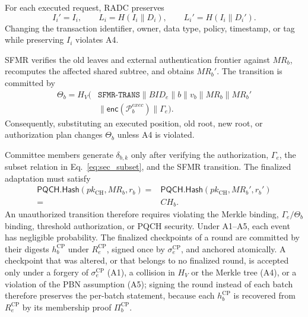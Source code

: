 \documentclass[lettersize,journal]{IEEEtran}
\begin{document}
For each executed request, RADC preserves
\begin{equation}
I_i'=I_i,
\qquad
L_i=H(I_i\parallel D_i),
\qquad
L_i'=H(I_i\parallel D_i').
\end{equation}
Changing the transaction identifier, owner, data type, policy,
timestamp, or tag while preserving $I_i$ violates A4.

SFMR verifies the old leaves and external authentication frontier
against $MR_b$, recomputes the affected shared subtree, and obtains
$MR_b'$. The transition is committed by
\begin{equation}
\begin{aligned}
\Theta_b=H_V(&\texttt{SFMR-TRANS}\parallel BID_e\parallel b
\parallel v_b\parallel MR_b\parallel MR_b'\\
&\parallel\mathsf{enc}(\mathcal{P}_b^{exec})
\parallel\Gamma_e).
\end{aligned}
\label{eq:sec_theta}
\end{equation}
Consequently, substituting an executed position, old root, new root,
or authorization plan changes $\Theta_b$ unless A4 is violated.

Committee members generate $\delta_{b,k}$ only after verifying the
authorization, $\Gamma_e$, the subset relation in
Eq.~\eqref{eq:sec_subset}, and the SFMR transition. The finalized
adaptation must satisfy
\begin{equation}
\begin{split}
\mathsf{PQCH.Hash}(pk_{\mathrm{CH}},MR_b,r_b)
={}&
\mathsf{PQCH.Hash}(pk_{\mathrm{CH}},MR_b',r_b')\\
={}&CH_b.
\end{split}
\label{eq:sec_pqch_continuity}
\end{equation}
An unauthorized transition therefore requires violating the Merkle
binding, $\Gamma_e/\Theta_b$ binding, threshold authorization, or
PQCH security. Under A1--A5, each event has negligible probability.
\textcolor{e5}{The finalized checkpoints of a round are committed by
their digests $h_b^{\mathrm{CP}}$ under $R_e^{\mathrm{CP}}$, signed once
by $\sigma_e^{\mathrm{CP}}$, and anchored atomically. A checkpoint that
was altered, or that belongs to no finalized round, is accepted only
under a forgery of $\sigma_e^{\mathrm{CP}}$ (A1), a collision in $H_V$ or
the Merkle tree (A4), or a violation of the PBN assumption (A5); signing
the round instead of each batch therefore preserves the per-batch
statement, because each $h_b^{\mathrm{CP}}$ is recovered from
$R_e^{\mathrm{CP}}$ by its membership proof $\Pi_b^{\mathrm{CP}}$.}
\end{document}
